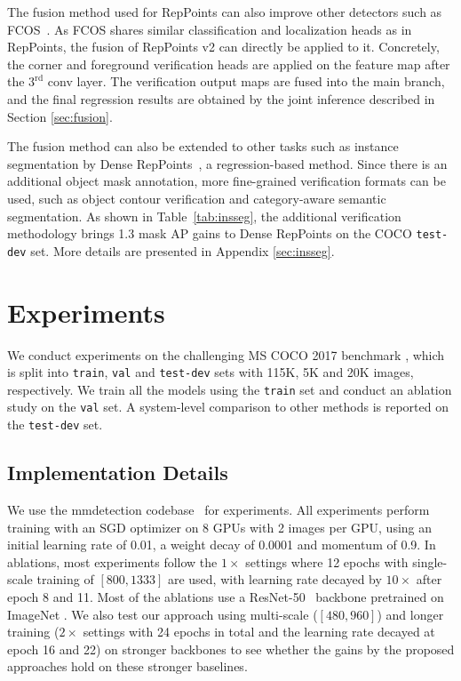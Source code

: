 \documentclass{article}
\begin{document}
The fusion method used for RepPoints can also improve other detectors such as FCOS~\cite{tian2019fcos}. As FCOS shares similar classification and localization heads as in RepPoints, the fusion of RepPoints v2 can directly be applied to it. Concretely, the corner and foreground verification heads are applied on the feature map after the $3^\text{rd}$ conv layer. The verification output maps are fused into the main branch, and the final regression results are obtained by the joint inference described in Section \ref{sec:fusion}. 


The fusion method can also be extended to other tasks such as instance segmentation by Dense RepPoints~\cite{yang19densereppts}, a regression-based method. Since there is an additional object mask annotation, more fine-grained verification formats can be used, such as object contour verification and category-aware semantic segmentation. As shown in Table~\ref{tab:insseg}, the additional verification methodology brings 1.3 mask AP gains to Dense RepPoints on the COCO \texttt{test-dev} set. More details are presented in Appendix \ref{sec:insseg}.

\section{Experiments}

We conduct experiments on the challenging MS COCO 2017 benchmark \cite{lin14coco}, which is split into \texttt{train}, \texttt{val} and \texttt{test-dev} sets with 115K, 5K and 20K images, respectively. We train all the models using the \texttt{train} set and conduct an ablation study on the \texttt{val} set. A system-level comparison to other methods is reported on the \texttt{test-dev} set. 

\subsection{Implementation Details}

We use the mmdetection codebase~\cite{mmdetection} for experiments. All experiments perform training with an SGD optimizer on 8 GPUs with 2 images per GPU, using an initial learning rate of 0.01, a weight decay of 0.0001 and momentum of 0.9. In ablations, most experiments follow the $1\times$ settings where 12 epochs with single-scale training of $[800,1333]$ are used, with learning rate decayed by $10\times$ after epoch 8 and 11. Most of the ablations use a ResNet-50~\cite{he16res} backbone pretrained on ImageNet \cite{olga15imagenet}. We also test our approach using multi-scale ($[480,960]$) and longer training ($2\times$ settings with 24 epochs in total and the learning rate decayed at epoch 16 and 22) on stronger backbones to see whether the gains by the proposed approaches hold on these stronger baselines.
\end{document}
